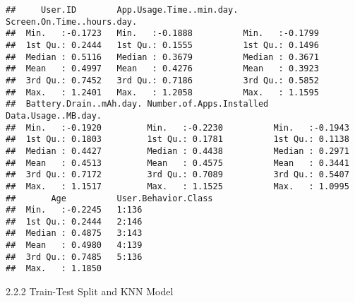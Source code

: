 \documentclass[
]{article}
\newenvironment{Shaded}{\begin{snugshade}}{\end{snugshade}}
\newcommand{\AttributeTok}[1]{\textcolor[rgb]{0.13,0.29,0.53}{#1}}
\newcommand{\CommentTok}[1]{\textcolor[rgb]{0.56,0.35,0.01}{\textit{#1}}}
\newcommand{\DecValTok}[1]{\textcolor[rgb]{0.00,0.00,0.81}{#1}}
\newcommand{\FloatTok}[1]{\textcolor[rgb]{0.00,0.00,0.81}{#1}}
\newcommand{\FunctionTok}[1]{\textcolor[rgb]{0.13,0.29,0.53}{\textbf{#1}}}
\newcommand{\NormalTok}[1]{#1}
\newcommand{\OtherTok}[1]{\textcolor[rgb]{0.56,0.35,0.01}{#1}}
\newcommand{\SpecialCharTok}[1]{\textcolor[rgb]{0.81,0.36,0.00}{\textbf{#1}}}
\begin{document}
\begin{verbatim}
##     User.ID        App.Usage.Time..min.day. Screen.On.Time..hours.day.
##  Min.   :-0.1723   Min.   :-0.1888          Min.   :-0.1799           
##  1st Qu.: 0.2444   1st Qu.: 0.1555          1st Qu.: 0.1496           
##  Median : 0.5116   Median : 0.3679          Median : 0.3671           
##  Mean   : 0.4997   Mean   : 0.4276          Mean   : 0.3923           
##  3rd Qu.: 0.7452   3rd Qu.: 0.7186          3rd Qu.: 0.5852           
##  Max.   : 1.2401   Max.   : 1.2058          Max.   : 1.1595           
##  Battery.Drain..mAh.day. Number.of.Apps.Installed Data.Usage..MB.day.
##  Min.   :-0.1920         Min.   :-0.2230          Min.   :-0.1943    
##  1st Qu.: 0.1803         1st Qu.: 0.1781          1st Qu.: 0.1138    
##  Median : 0.4427         Median : 0.4438          Median : 0.2971    
##  Mean   : 0.4513         Mean   : 0.4575          Mean   : 0.3441    
##  3rd Qu.: 0.7172         3rd Qu.: 0.7089          3rd Qu.: 0.5407    
##  Max.   : 1.1517         Max.   : 1.1525          Max.   : 1.0995    
##       Age          User.Behavior.Class
##  Min.   :-0.2245   1:136              
##  1st Qu.: 0.2444   2:146              
##  Median : 0.4875   3:143              
##  Mean   : 0.4980   4:139              
##  3rd Qu.: 0.7485   5:136              
##  Max.   : 1.1850
\end{verbatim}

2.2.2 Train-Test Split and KNN Model

\begin{Shaded}
\end{Shaded}
\end{document}
